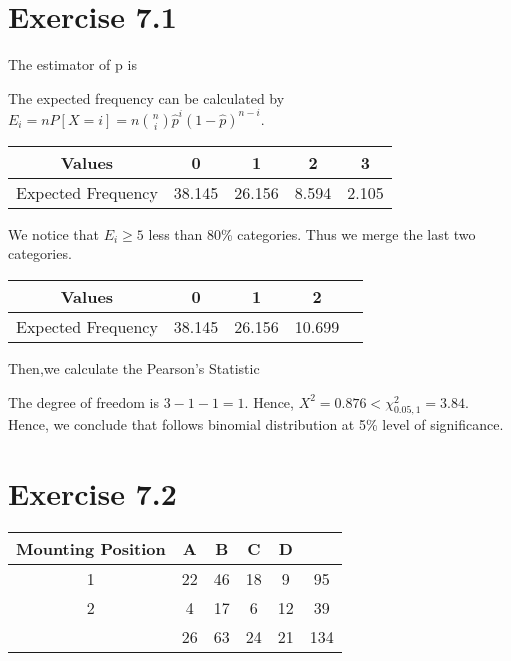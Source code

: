 \section*{Exercise 7.1}
The estimator of p is

The expected frequency can be calculated by $E_i=nP[X=i]=n\binom{n}{i}\hat{p}^i(1-\hat{p})^{n-i}$.
\begin{table}[H]
    \centering
    \begin{tabular}{ccccc}\hline
        Values & 0 & 1 & 2 & 3\\\hline
        Expected Frequency & 38.145 & 26.156 & 8.594 & 2.105\\\hline
    \end{tabular}
\end{table}

We notice that $E_i\geq5$ less than 80\% categories. Thus we merge the last two categories.
\begin{table}[H]
    \centering
    \begin{tabular}{ccccc}\hline
        Values & 0 & 1 & 2\\\hline
        Expected Frequency & 38.145 & 26.156 & 10.699\\\hline
    \end{tabular}
\end{table}

Then,we calculate the Pearson's Statistic

The degree of freedom is $3-1-1=1$. Hence, $X^2=0.876<\chi^2_{0.05,1}=3.84$. Hence, we conclude that follows binomial distribution at 5\% level of significance.

\section*{Exercise 7.2}
\begin{table}[h]
    \centering
    \begin{tabular}{c|cccc|c}
        Mounting Position & A & B & C & D & \\\hline
        1 & 22 & 46 & 18 & 9 & 95\\
        2 & 4 & 17 & 6 & 12 & 39\\\hline
        & 26 & 63 & 24 & 21 & 134\\
    \end{tabular}
\end{table}


